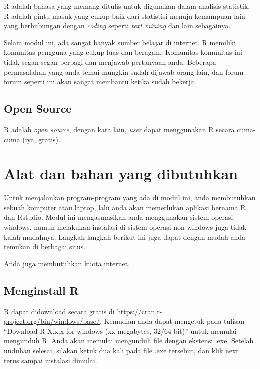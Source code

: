 \documentclass[
]{book}
\begin{document}
R adalah bahasa yang memang ditulis untuk digunakan dalam analisis statistik. R adalah pintu masuk yang cukup baik dari statistisi menuju kemampuan lain yang berhubungan dengan \emph{coding} seperti \emph{text mining} dan lain sebagainya.

Selain modul ini, ada sangat banyak sumber belajar di internet. R memiliki komunitas pengguna yang cukup luas dan beragam. Komunitas-komunitas ini tidak segan-segan berbagi dan menjawab pertanyaan anda. Beberapa permasalahan yang anda temui mungkin sudah dijawab orang lain, dan forum-forum seperti ini akan sangat membantu ketika sudah bekerja.

\hypertarget{open-source}{%
\subsection{Open Source}\label{open-source}}

R adalah \emph{open source}, dengan kata lain, \emph{user} dapat menggunakan R secara cuma-cuma (iya, gratis).

\hypertarget{alat-dan-bahan-yang-dibutuhkan}{%
\section{Alat dan bahan yang dibutuhkan}\label{alat-dan-bahan-yang-dibutuhkan}}

Untuk menjalankan program-program yang ada di modul ini, anda membutuhkan sebuah komputer atau laptop, lalu anda akan memerlukan aplikasi bernama R dan Rstudio. Modul ini mengasumsikan anda menggunakan sistem operasi windows, namun melakukan instalasi di sistem operasi non-windows juga tidak kalah mudahnya. Langkah-langkah berikut ini juga dapat dengan mudah anda temukan di berbagai situs.

Anda juga membutuhkan kuota internet.

\hypertarget{menginstall-r}{%
\subsection{Menginstall R}\label{menginstall-r}}

R dapat didownload secara gratis di \url{https://cran.r-project.org/bin/windows/base/}. Kemudian anda dapat mengetuk pada tulisan ``Download R X.x.x for windows (xx megabytes, 32/64 bit)'' untuk memulai mengunduh R. Anda akan memulai mengunduh file dengan ekstensi .exe. Setelah unduhan selesai, silakan ketuk dua kali pada file .exe tersebut, dan klik next terus sampai instalasi dimulai.
\end{document}
